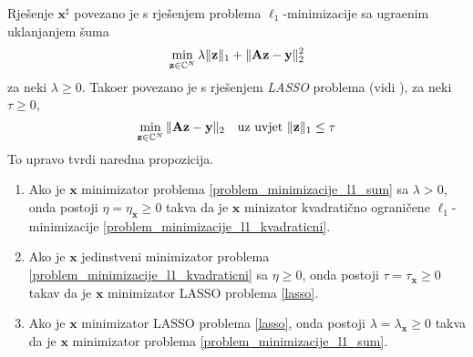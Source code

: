 \documentclass[a4paper,twoside,12pt]{memoir} %
\newcommand{\vect}[1]{\mathbf{#1}}
\renewcommand{\vec}{\vect}
\newcommand{\norm}[1]{\|{#1}\|}
\begin{document}
Rje\v{s}enje $\vec x^{\sharp}$ povezano je s rje\v{s}enjem problema $\ell_1$-minimizacije sa ugra\dj enim uklanjanjem \v{s}uma
\begin{equation}\label{problem_minimizacije_l1_sum}
    \min_{\vec z \in \C^N} \lambda\norm{\vec z}_1 + \norm{\vec{Az}-\vec y}_2^2
\end{equation}
za neki $\lambda \geq 0$. Tako\dj er povezano je s rje\v{s}enjem \textit{LASSO} problema (vidi \cite{tibshirani96regression}), za neki $\tau \geq 0$,
\begin{equation}\label{lasso}
    \min_{\vec z \in \C^N} \norm{\vec{Az}-\vec y}_2\quad \text{uz uvjet } \norm{\vec z}_1\leq \tau
\end{equation}
To upravo tvrdi naredna propozicija.
\begin{prop}
    \begin{enumerate}[label=(\alph*)]
        \item Ako je $\vec x$ minimizator problema \eqref{problem_minimizacije_l1_sum} sa $\lambda > 0$, onda postoji $\eta = \eta_{\vec x} \geq 0$ takva da je $\vec x$ minizator kvadrati\v{c}no ograni\v{c}ene $\ell_1$-minimizacije \eqref{problem_minimizacije_l1_kvadraticni}.
        \item Ako je $\vec x$ jedinstveni minimizator problema \eqref{problem_minimizacije_l1_kvadraticni} sa $\eta \geq 0$, onda postoji $\tau = \tau_{\vec x} \geq 0$ takav da je $\vec x$ minimizator LASSO problema \eqref{lasso}.
        \item Ako je $\vec x$ minimizator LASSO problema \eqref{lasso}, onda postoji $\lambda = \lambda_{\vec x} \geq  0$ takva da je $\vec x$ minimizator problema \eqref{problem_minimizacije_l1_sum}.
    \end{enumerate}
\end{prop}
\end{document}
